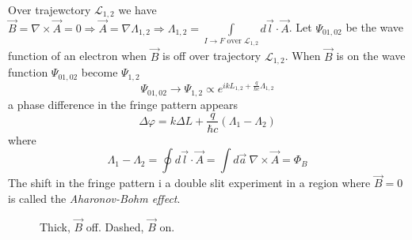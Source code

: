 \documentclass[12pt,a4paper]{article}
\begin{document}
Over trajewctory $\mathcal{L}_{1,2}$ we have $\vec{B}=\nabla \times \vec{A} = 0 \Rightarrow \vec{A} =  \nabla \Lambda_{1,2} \Rightarrow \Lambda_{1,2} = \int\limits_{I\rightarrow F \text{ over } \mathcal{L}_{1,2}}{}{d\vec{l}\cdot\vec{A}}$. Let $\Psi_{01,02}$ be the wave function of an electron when $\vec{B}$ is off over trajectory $\mathcal{L}_{1,2}$. When $\vec{B}$ is on the wave function $\Psi_{01,02}$ become $\Psi_{1,2}$
\begin{equation}
	\Psi_{01,02} \rightarrow \Psi_{1,2} \propto e^{ikL_{1,2}+ \frac{q}{\hbar c}\Lambda_{1,2}}
\end{equation}
a phase difference in the fringe pattern appears
\begin{equation}
	 \Delta \varphi = k\Delta L +\frac{q}{\hbar c}(\Lambda_1 - \Lambda_2)
\end{equation}
where
\begin{equation}
\Lambda_1 - \Lambda_2 = \oint d \vec{l} \cdot \vec{A} = \int d\vec{a} \ \nabla \times \vec{A} = \Phi_B
\end{equation}
The shift in the fringe pattern i a double slit experiment in a region where $\vec{B} = 0$ is called the \textit{Aharonov-Bohm effect}.

\begin{figure}[h]
	\centering
	\caption{Thick, $\vec{B}$ off. Dashed, $\vec{B}$ on.}
\end{figure}
\end{document}
